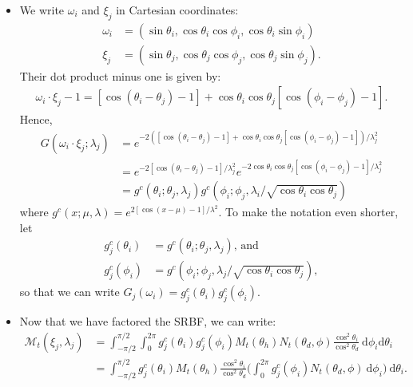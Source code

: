 \documentclass[10pt]{article}
\newcommand{\dee}{\mathrm{d}}
\newcommand{\modeint}{\mathcal{M}}
\begin{document}
\begin{itemize}
    \item We write $\omega_i$ and $\xi_j$ in Cartesian coordinates:
    \begin{align*}
      \omega_i &= (\sin \theta_i, \cos \theta_i \cos \phi_i, \cos \theta_i \sin \phi_i)\\
      \xi_j &= (\sin \theta_j, \cos \theta_j \cos \phi_j, \cos \theta_j \sin \phi_j).
    \end{align*}
    Their dot product minus one is given by:
    \begin{align*}
      \omega_i \cdot \xi_j - 1 = [\cos(\theta_i - \theta_j) - 1] + \cos \theta_i \cos \theta_j [\cos(\phi_i - \phi_j) - 1].
    \end{align*}
    Hence,
    \begin{align*}
      G(\omega_i \cdot \xi_j; \lambda_j) 
      &= e^{-2([\cos(\theta_i - \theta_j) - 1] + \cos \theta_i \cos \theta_j [\cos(\phi_i - \phi_j) - 1])/\lambda_j^2}\\      
      &= e^{-2[\cos(\theta_i - \theta_j) - 1]/\lambda_j^2 } e^{ - 2 \cos\theta_i \cos \theta_j [\cos(\phi_i - \phi_j) - 1]/\lambda_j^2}\\
      &= g^c(\theta_i; \theta_j, \lambda_j) g^c(\phi_i; \phi_j, \lambda_i / \sqrt{\cos \theta_i \cos \theta_j})
    \end{align*}
    where $g^c(x; \mu, \lambda) = e^{2[\cos(x-\mu)-1]/\lambda^2}$. To make the notation even shorter, let
    \begin{align*}
      g^c_j(\theta_i) &= g^c(\theta_i;\theta_j, \lambda_j)\mbox{, and}\\
      g^c_j(\phi_i) &=g^c(\phi_i;\phi_j, \lambda_j / \sqrt{\cos \theta_i \cos\theta_j}),
    \end{align*}
    so that we can write $G_j(\omega_i) = g^c_j(\theta_i) g^c_j(\phi_i)$.
  
    \item Now that we have factored the SRBF, we can write:
    \begin{align*}
      \modeint_t(\xi_j, \lambda_j) 
      &= \int_{-\pi/2}^{\pi/2} \int_0^{2\pi} g^c_j(\theta_i) g^c_j(\phi_i) M_t(\theta_h) N_t(\theta_d, \phi) \frac{\cos^2 \theta_i}{\cos^2 \theta_d}\ \dee \phi_i \dee \theta_i\\
      &= \int_{-\pi/2}^{\pi/2} g^c_j(\theta_i)  M_t(\theta_h) \frac{\cos^2 \theta_i}{\cos^2 \theta_d} \bigg( \int_0^{2\pi} g^c_j(\phi_i) N_t(\theta_d, \phi)\ \dee \phi_i \bigg)\ \dee \theta_i.
    \end{align*}    
    

\end{itemize}
\end{document}
